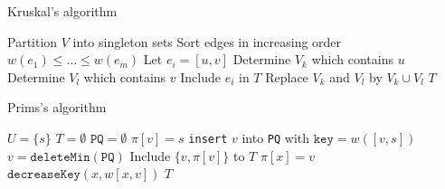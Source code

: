 \begin{algorithm}
  \caption{Kruskal's algorithm}\label{graph:kruskal}
  \begin{algorithmic}
    \State Partition $V$ into singleton sets
    \State Sort edges in increasing order $w(e_1)\leq\ldots\leq w(e_m)$
        \State Let $e_i=[u,v]$
        \State Determine $V_k$ which contains $u$
        \State Determine $V_l$ which contains $v$
          \State Include $e_i$ in $T$
          \State Replace $V_k$ and $V_l$ by $V_k\cup V_l$
        \EndIf
      \EndFor
      \State
      \Return $T$
    \EndFunction
  \end{algorithmic}
\end{algorithm}

\begin{algorithm}
  \caption{Prims's algorithm}\label{graph:prim}
  \begin{algorithmic}
      \State $U=\{s\}$
      \State $T=\emptyset$
      \State $\texttt{PQ}=\emptyset$
        \State $\pi[v]=s$
        \State \texttt{insert} $v$ into \texttt{PQ} with $\texttt{key}=w([v,s])$
      \EndFor
      \Repeat
        \State $v=\texttt{deleteMin}(\texttt{PQ})$
        \State Include $\{v,\pi[v]\}$ to $T$
              \State $\pi[x]=v$
              \State $\texttt{decreaseKey}(x,w[x,v])$
            \EndIf
          \EndIf
        \EndFor
      \State\Return $T$
    \EndFunction
  \end{algorithmic}
\end{algorithm}



